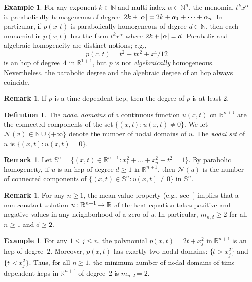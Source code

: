 \documentclass[10pt]{amsart}
\theoremstyle{definition}\newtheorem{defi}[theo]{Definition}\newtheorem{rema}[theo]{Remark}\newtheorem{exam}[theo]{Example}\newtheorem{exem}[theo]{Example}\newtheorem{nota}[theo]{Notation}
\newcommand{\N}{\mathbb{N}}
\newcommand{\R}{\mathbb{R}}
\newcommand{\sphere}{\mathbb{S}}
\newcommand{\abs}[1]{\left \lvert #1 \right \rvert}
\newcommand{\nodal}{\mathcal{N}}
\renewcommand*{\to}{\mathchoice{\longrightarrow}{\rightarrow}{\rightarrow}{\rightarrow}}
\let\originalleft\left
\let\originalright\right
\renewcommand{\left}{\mathopen{}\mathclose\bgroup\originalleft}
\renewcommand{\right}{\aftergroup\egroup\originalright}
\begin{document}
\begin{exam}\label{eg:hcp}
For any exponent $k\in \N$ and multi-index $\alpha\in\N^n$, the monomial $t^k x^\alpha$ is parabolically homogeneous{} of degree~$2k + \abs{\alpha}=2k+\alpha_1+\dots+\alpha_n$. In particular, if $p(x,t)$ is parabolically homogeneous{} of degree $d \in \N$, then each monomial in $p(x,t)$ has the form $t^k x^\alpha$ where $2k + \abs{\alpha} = d$. Parabolic and algebraic homogeneity are distinct notions; e.g.,
\begin{equation}
p(x,t)= t^2 +tx^2 + x^4/12
\end{equation}
is an hcp of degree~$4$ in $\R^{1+1}$, but $p$ is not \emph{algebraically} homogeneous. Nevertheless, the parabolic degree and the algebraic degree of an hcp always coincide.
\end{exam}

\begin{rema}
If $p$ is a time-dependent hcp, then the degree of $p$ is at least 2.
\end{rema}


\begin{defi}
The \emph{nodal domains} of a continuous function $u(x,t)$ on $\R^{n+1}$ are the connected components of the set $\{(x,t) : u(x,t) \ne 0\}$. We let $\nodal(u) \in \N \cup \{+\infty\}$ denote the number of nodal domains of $u$. The \emph{nodal set} of $u$ is $\{(x,t):u(x,t)=0\}$.
\end{defi}

\begin{rema}\label{r:sphere}
Let $\sphere^n=\{(x,t)\in\R^{n+1}:x_1^2+\dots+x_n^2+t^2=1\}$. By parabolic homogeneity, if $u$ is an hcp of degree $d\geq 1$ in $\R^{n+1}$, then $\nodal(u)$ is the number of connected components of $\{(x,t)\in\sphere^n:u(x,t)\neq 0\}$ in $\sphere^n$.
\end{rema}

\begin{rema}\label{r:meanvalue}
For any $n\geq 1$, the mean value property (e.g., see~\cite[p.~50]{Evans-PDE}) implies that a non-constant solution $u:\R^{n+1}\to \R$ of the heat equation takes positive and negative values in any neighborhood of a zero of $u$. In particular, $m_{n,d}\geq 2$ for all $n\geq 1$ and $d\geq 2$.
\end{rema}

\begin{exam}\label{eq:deg_2}
For any $1\leq j\leq n$, the polynomial $p(x,t) = 2t + x_j^2$ in $\R^{n+1}$ is an hcp of degree~$2$. Moreover, $p(x,t)$ has exactly two nodal domains: $\{ t > x_j^2\}$ and $\{t < x_j^2 \}$. Thus, for all $n\geq 1$, the minimum number of nodal domains of time-dependent hcps in $\R^{n+1}$ of degree~2 is $m_{n,2}=2$.
\end{exam}
\end{document}
